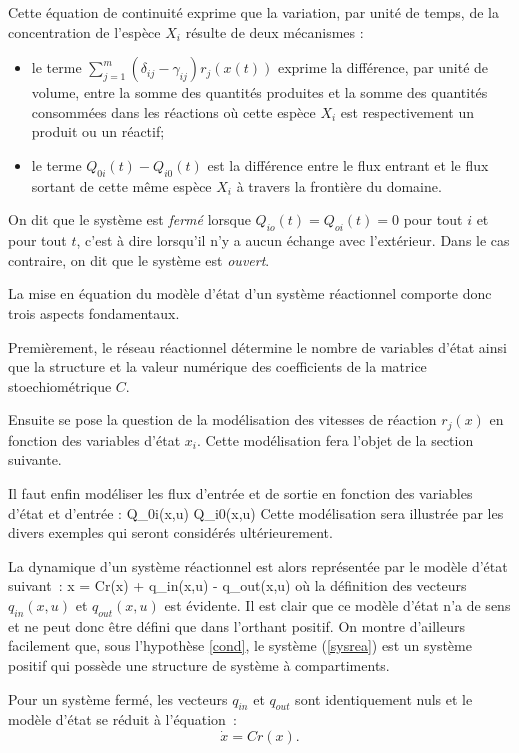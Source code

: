 Cette équation de continuité exprime
que la variation, par  unité de temps,  de la  concentration de l'espèce $X_i$
résulte de deux mécanismes : 
\begin{itemize}
\item le terme $\sum_{j = 1}^{m} (\delta_{ij} - \gamma_{ij})r_j(x(t))$
exprime la différence, par unité de volume, entre la somme des quantités produites et la somme
des quantités consommées dans les réactions où
cette espèce $X_i$ est respectivement un produit ou un réactif;
\item le terme $Q_{0i}(t) - Q_{i0}(t)$ est la différence entre le flux entrant et
le flux sortant de cette même espèce $X_i$ à travers la frontière du
domaine.
\end{itemize}

On dit que le système est {\em fermé} lorsque
$Q_{io}(t) =  Q_{oi}(t) = 0$ pour tout $i$ et pour tout $t$, c'est à dire lorsqu'il
n'y a aucun échange avec l'extérieur.  Dans le cas contraire, on dit que le
système est {\em ouvert}. 

La mise en équation du modèle d'état d'un système réactionnel
comporte donc trois aspects fondamentaux.

Premièrement, le réseau réactionnel détermine le nombre de variables
d'état ainsi que la structure et la valeur numérique des coefficients de la
matrice stoechiométrique $C$.

Ensuite se pose la question de la modélisation  des
vitesses de réaction $r_j(x)$ en fonction des variables d'état $x_i$. Cette
modélisation fera l'objet de la section suivante.

Il faut enfin modéliser les flux d'entrée et de sortie en fonction des
variables d'état et d'entrée :
\eqnn
Q_{0i}(x,u) \hspace{1cm} Q_{i0}(x,u)
\eeqnn
Cette modélisation sera illustrée par les divers exemples qui seront
considérés ultérieurement.

La dynamique d'un système réactionnel
est alors représentée par le modèle d'état suivant~: 
\eqn 
\dot x =  Cr(x) + q_{in}(x,u) - q_{out}(x,u) \label{sysrea} 
\eeqn
où la définition des vecteurs $q_{in}(x,u)$ et $q_{out}(x,u)$ est évidente. Il est clair que ce
modèle d'état n'a de sens et ne peut donc être défini que dans l'orthant
positif. On montre d'ailleurs facilement que, sous l'hypothèse \ref{cond}, le
système (\ref{sysrea}) est  un système positif qui possède une structure de système à compartiments.

Pour un système fermé, les vecteurs $q_{in}$ et
$q_{out}$ sont identiquement nuls  et le modèle d'état se réduit à
l'équation~:
$$
\dot{x} = Cr(x). \label{sysreaferm}
$$

